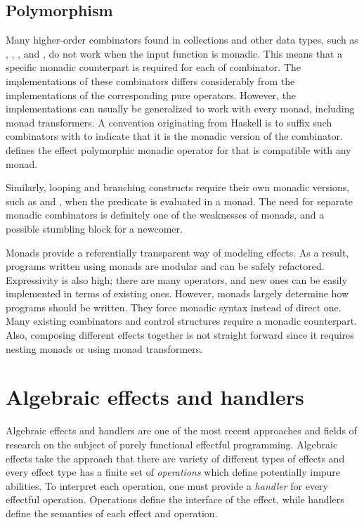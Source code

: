 


\subsection{Polymorphism}
Many higher-order combinators found in collections and other data types, such as , , , and , do not work when the input function is monadic. This means that a specific monadic counterpart is required for each of combinator. The implementations of these combinators differs considerably from the implementations of the corresponding pure operators. However, the implementations can usually be generalized to work with every monad, including monad transformers. A convention originating from Haskell is to suffix such combinators with  to indicate that it is the monadic version of the combinator.  defines the effect polymorphic monadic  operator for  that is compatible with any monad.



Similarly, looping and branching constructs require their own monadic versions, such as  and , when the predicate is evaluated in a monad. The need for separate monadic combinators is definitely one of the weaknesses of monads, and a possible stumbling block for a newcomer.

Monads provide a referentially transparent way of modeling effects. As a result, programs written using monads are modular and can be safely refactored. Expressivity is also high; there are many operators, and new ones can be easily implemented in terms of existing ones. However, monads largely determine how  programs should be written. They force monadic syntax instead of direct one. Many existing combinators and control structures require a monadic counterpart. Also, composing different effects together is not straight forward since it requires nesting monads or using monad transformers.



\section{Algebraic effects and handlers} \label{algebraic-effects}
Algebraic effects and handlers are one of the most recent approaches and fields of research on the subject of purely functional effectful programming. Algebraic effects take the approach that there are variety of different types of effects and every effect type has a finite set of \emph{operations} which define potentially impure abilities. To interpret each operation, one must provide a \emph{handler} for every effectful operation. Operations define the interface of the effect, while handlers define the semantics of each effect and operation.

